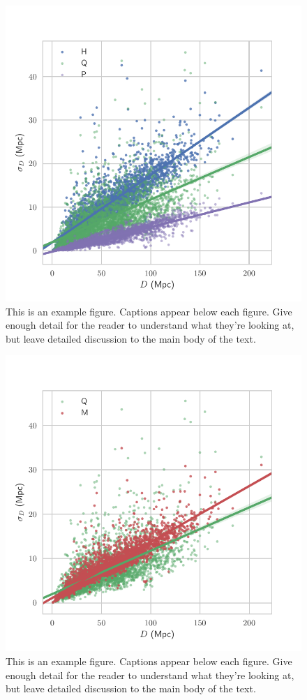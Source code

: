 \documentclass[a4paper,fleqn,usenatbib]{mnras}
\begin{document}
\begin{figure}

	\includegraphics[scale=0.7]{hqp}
    \caption{This is an example figure. Captions appear below each figure.
	Give enough detail for the reader to understand what they're looking at,
	but leave detailed discussion to the main body of the text.}
    \label{fig:hqp}
\end{figure}

\begin{figure}

	\includegraphics[scale=0.7]{qm}
    \caption{This is an example figure. Captions appear below each figure.
	Give enough detail for the reader to understand what they're looking at,
	but leave detailed discussion to the main body of the text.}
    \label{fig:qm}
\end{figure}
\end{document}
